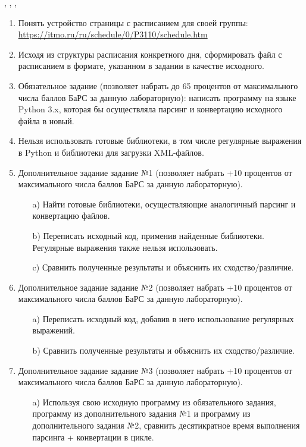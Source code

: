 \begin{center}
    {, , ,}
\end{center} 
\begin{enumerate}
    \item Понять устройство страницы с расписанием для своей группы: \url{https://itmo.ru/ru/schedule/0/P3110/schedule.htm}
\item Исходя из структуры расписания конкретного дня, сформировать файл с расписанием в формате, указанном в задании в качестве исходного.
\item Обязательное задание (позволяет набрать до 65 процентов от  максимального числа баллов БаРС за данную лабораторную): написать  программу на языке Python 3.x, которая бы осуществляла парсинг и  конвертацию исходного файла в новый.
\item Нельзя использовать готовые библиотеки, в том числе регулярные  выражения в Python и библиотеки для загрузки XML-файлов.
\item Дополнительное задание задание №1 (позволяет набрать +10 процентов  от максимального числа баллов БаРС за данную лабораторную).
    \begin{itemize}
        \item[a)] Найти готовые библиотеки, осуществляющие аналогичный  парсинг и конвертацию файлов.
        \item[b)] Переписать исходный код, применив найденные библиотеки.  Регулярные выражения также нельзя использовать.
        \item[c)] Сравнить полученные результаты и объяснить их  сходство/различие.
    \end{itemize}
\item Дополнительное задание задание №2 (позволяет набрать +10 процентов  от максимального числа баллов БаРС за данную лабораторную).
    \begin{itemize}
        \item[a)] Переписать исходный код, добавив в него использование  регулярных выражений.
        \item[b)] Сравнить полученные результаты и объяснить их  сходство/различие.
    \end{itemize}
\item Дополнительное задание задание №3 (позволяет набрать +10 процентов  от максимального числа баллов БаРС за данную лабораторную).
    \begin{itemize}
        \item[a)] Используя свою исходную программу из обязательного  задания, программу из дополнительного задания №1 и  программу из дополнительного задания №2, сравнить  десятикратное время выполнения парсинга + конвертации в  цикле.

\end{itemize}
\end{enumerate}
